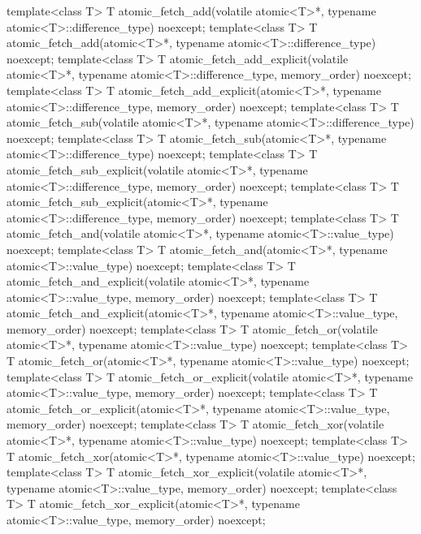 \begin{codeblock}
{  template<class T>
    T atomic_fetch_add(volatile atomic<T>*, typename atomic<T>::difference_type) noexcept;
  template<class T>
    T atomic_fetch_add(atomic<T>*, typename atomic<T>::difference_type) noexcept;
  template<class T>
    T atomic_fetch_add_explicit(volatile atomic<T>*, typename atomic<T>::difference_type,
                                memory_order) noexcept;
  template<class T>
    T atomic_fetch_add_explicit(atomic<T>*, typename atomic<T>::difference_type,
                                memory_order) noexcept;
  template<class T>
    T atomic_fetch_sub(volatile atomic<T>*, typename atomic<T>::difference_type) noexcept;
  template<class T>
    T atomic_fetch_sub(atomic<T>*, typename atomic<T>::difference_type) noexcept;
  template<class T>
    T atomic_fetch_sub_explicit(volatile atomic<T>*, typename atomic<T>::difference_type,
                                memory_order) noexcept;
  template<class T>
    T atomic_fetch_sub_explicit(atomic<T>*, typename atomic<T>::difference_type,
                                memory_order) noexcept;
  template<class T>
    T atomic_fetch_and(volatile atomic<T>*, typename atomic<T>::value_type) noexcept;
  template<class T>
    T atomic_fetch_and(atomic<T>*, typename atomic<T>::value_type) noexcept;
  template<class T>
    T atomic_fetch_and_explicit(volatile atomic<T>*, typename atomic<T>::value_type,
                                memory_order) noexcept;
  template<class T>
    T atomic_fetch_and_explicit(atomic<T>*, typename atomic<T>::value_type,
                                memory_order) noexcept;
  template<class T>
    T atomic_fetch_or(volatile atomic<T>*, typename atomic<T>::value_type) noexcept;
  template<class T>
    T atomic_fetch_or(atomic<T>*, typename atomic<T>::value_type) noexcept;
  template<class T>
    T atomic_fetch_or_explicit(volatile atomic<T>*, typename atomic<T>::value_type,
                               memory_order) noexcept;
  template<class T>
    T atomic_fetch_or_explicit(atomic<T>*, typename atomic<T>::value_type,
                               memory_order) noexcept;
  template<class T>
    T atomic_fetch_xor(volatile atomic<T>*, typename atomic<T>::value_type) noexcept;
  template<class T>
    T atomic_fetch_xor(atomic<T>*, typename atomic<T>::value_type) noexcept;
  template<class T>
    T atomic_fetch_xor_explicit(volatile atomic<T>*, typename atomic<T>::value_type,
                                memory_order) noexcept;
  template<class T>
    T atomic_fetch_xor_explicit(atomic<T>*, typename atomic<T>::value_type,
                                memory_order) noexcept;

}
\end{codeblock}
